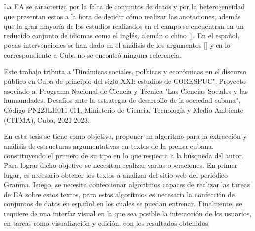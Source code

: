 La EA se caracteriza por la falta de conjuntos de datos y 
por la heterogeneidad que presentan estos a la hora de decidir cómo realizar las 
anotaciones, además que la gran mayoría de los estudios realizados en el campo se encuentran en 
un reducido conjunto de idiomas como el inglés, alemán o chino [\cite{eger2018cross}]. 
En el español, pocas intervenciones se han dado en el análisis de los argumentos [\cite{esteve2020mineria}] y en 
lo correspondiente a Cuba no se encontró ninguna referencia. 


Este trabajo tributa a "Dinámicas sociales, políticas y económicas en el discurso público 
en Cuba de principio del siglo XXI: estudios de CORESPUC". Proyecto 
asociado al Programa Nacional de Ciencia y Técnica "Las Ciencias Sociales y las humanidades. 
Desafíos ante la estrategia de desarrollo de la sociedad cubana", Código PN223LH011-011, Ministerio
de Ciencia, Tecnología y Medio Ambiente (CITMA), Cuba, 2021-2023.


En esta tesis se tiene como objetivo, proponer un algoritmo para 
la extracción y análisis de estructuras argumentativas en textos 
de la prensa cubana, constituyendo el primero de su tipo en lo que respecta a la búsqueda del autor. 
Para lograr dicho objetivo se necesitan realizar varias operaciones.
En primer lugar, es necesario obtener los textos a analizar del sitio 
web del periódico Granma. Luego, se necesita confeccionar algoritmos capaces de realizar las tareas 
de EA sobre estos textos, para estos algoritmos es necesaria la confección de conjuntos 
de datos en español en los cuales se puedan entrenar. Finalmente, se requiere de una interfaz visual 
en la que sea posible la interacción de los usuarios, en tareas como visualización y edición, 
con los resultados obtenidos. 

